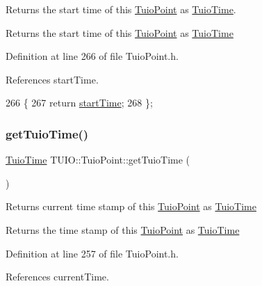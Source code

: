 Returns the start time of this \hyperlink{class_t_u_i_o_1_1_tuio_point}{Tuio\+Point} as \hyperlink{class_t_u_i_o_1_1_tuio_time}{Tuio\+Time}.

\begin{DoxyReturn}{Returns}
the start time of this \hyperlink{class_t_u_i_o_1_1_tuio_point}{Tuio\+Point} as \hyperlink{class_t_u_i_o_1_1_tuio_time}{Tuio\+Time} 
\end{DoxyReturn}


Definition at line 266 of file Tuio\+Point.\+h.



References start\+Time.


\begin{DoxyCode}
266                                 \{
267             \textcolor{keywordflow}{return} \hyperlink{class_t_u_i_o_1_1_tuio_point_ac69cfb9784d5fdc966fba57459d1d8e5}{startTime};
268         \};
\end{DoxyCode}
\mbox{\label{class_t_u_i_o_1_1_tuio_point_a0ad5b8a78622b5b2a92c8d1bb165cd45}} 
\subsubsection{\texorpdfstring{get\+Tuio\+Time()}{getTuioTime()}}
{\footnotesize\ttfamily \hyperlink{class_t_u_i_o_1_1_tuio_time}{Tuio\+Time} T\+U\+I\+O\+::\+Tuio\+Point\+::get\+Tuio\+Time (\begin{DoxyParamCaption}{ }\end{DoxyParamCaption})\hspace{0.3cm}{\ttfamily [inline]}}

Returns current time stamp of this \hyperlink{class_t_u_i_o_1_1_tuio_point}{Tuio\+Point} as \hyperlink{class_t_u_i_o_1_1_tuio_time}{Tuio\+Time}

\begin{DoxyReturn}{Returns}
the time stamp of this \hyperlink{class_t_u_i_o_1_1_tuio_point}{Tuio\+Point} as \hyperlink{class_t_u_i_o_1_1_tuio_time}{Tuio\+Time} 
\end{DoxyReturn}


Definition at line 257 of file Tuio\+Point.\+h.



References current\+Time.



